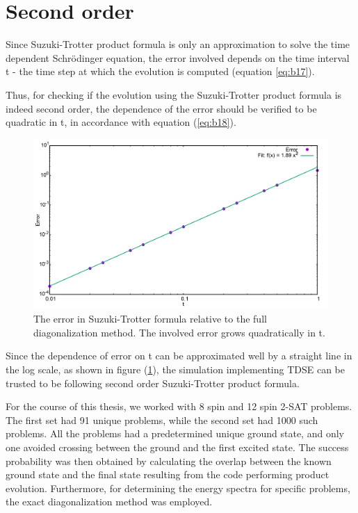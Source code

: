 \documentclass[../main.tex]{subfiles}
\begin{document}
\section{Second order}
Since Suzuki-Trotter product formula is only an approximation to solve the time dependent Schr{\"o}dinger equation, the error involved depends on the time interval t - the time step at which the evolution is computed (equation \ref{eq:b17}). 

Thus, for checking if the evolution using the Suzuki-Trotter product formula is indeed second order, the dependence of the error should be verified to be quadratic in t, in accordance with equation (\ref{eq:b18}). 
\begin{figure}[H]
\centering 
\includegraphics[scale=0.3]{Error.png}
\caption{The error in Suzuki-Trotter formula relative to the full diagonalization method. The involved error grows quadratically in t.}
\label{fig:o1}
\end{figure}
Since the dependence of error on t can be approximated well by a straight line in the log scale, as shown in figure (\ref{fig:o1}), the simulation implementing TDSE can be trusted to be following second order Suzuki-Trotter product formula.

For the course of this thesis, we worked with 8 spin and 12 spin 2-SAT problems. The first set had 91 unique problems, while the second set had 1000 such problems. All the problems had a predetermined unique ground state, and only one avoided crossing between the ground and the first excited state. The success probability was then obtained by calculating the overlap between the known ground state and the final state resulting from the code performing product evolution. Furthermore, for determining the energy spectra for specific problems, the exact diagonalization method was employed.
\end{document}
